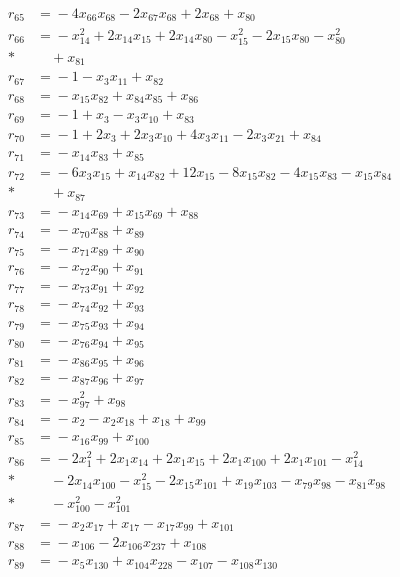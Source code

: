 \documentclass[11pt]{article}
\theoremstyle{remark}\newtheorem{remark}[theorem]{Remark}
\begin{document}
\begin{align*}
r_{65}&={}-4x_{66}x_{68}-2x_{67}x_{68}+2x_{68}+x_{80}\\[2pt]
r_{66}&={}-x_{14}^{2}+2x_{14}x_{15}+2x_{14}x_{80}-x_{15}^{2}-2x_{15}x_{80}-x_{80}^{2}\\*
&\quad{}+x_{81}\\[2pt]
r_{67}&={}-1-x_{3}x_{11}+x_{82}\\[2pt]
r_{68}&={}-x_{15}x_{82}+x_{84}x_{85}+x_{86}\\[2pt]
r_{69}&={}-1+x_{3}-x_{3}x_{10}+x_{83}\\[2pt]
r_{70}&={}-1+2x_{3}+2x_{3}x_{10}+4x_{3}x_{11}-2x_{3}x_{21}+x_{84}\\[2pt]
r_{71}&={}-x_{14}x_{83}+x_{85}\\[2pt]
r_{72}&={}-6x_{3}x_{15}+x_{14}x_{82}+12x_{15}-8x_{15}x_{82}-4x_{15}x_{83}-x_{15}x_{84}\\*
&\quad{}+x_{87}\\[2pt]
r_{73}&={}-x_{14}x_{69}+x_{15}x_{69}+x_{88}\\[2pt]
r_{74}&={}-x_{70}x_{88}+x_{89}\\[2pt]
r_{75}&={}-x_{71}x_{89}+x_{90}\\[2pt]
r_{76}&={}-x_{72}x_{90}+x_{91}\\[2pt]
r_{77}&={}-x_{73}x_{91}+x_{92}\\[2pt]
r_{78}&={}-x_{74}x_{92}+x_{93}\\[2pt]
r_{79}&={}-x_{75}x_{93}+x_{94}\\[2pt]
r_{80}&={}-x_{76}x_{94}+x_{95}\\[2pt]
r_{81}&={}-x_{86}x_{95}+x_{96}\\[2pt]
r_{82}&={}-x_{87}x_{96}+x_{97}\\[2pt]
r_{83}&={}-x_{97}^{2}+x_{98}\\[2pt]
r_{84}&={}-x_{2}-x_{2}x_{18}+x_{18}+x_{99}\\[2pt]
r_{85}&={}-x_{16}x_{99}+x_{100}\\[2pt]
r_{86}&={}-2x_{1}^{2}+2x_{1}x_{14}+2x_{1}x_{15}+2x_{1}x_{100}+2x_{1}x_{101}-x_{14}^{2}\\*
&\quad{}-2x_{14}x_{100}-x_{15}^{2}-2x_{15}x_{101}+x_{19}x_{103}-x_{79}x_{98}-x_{81}x_{98}\\*
&\quad{}-x_{100}^{2}-x_{101}^{2}\\[2pt]
r_{87}&={}-x_{2}x_{17}+x_{17}-x_{17}x_{99}+x_{101}\\[2pt]
r_{88}&={}-x_{106}-2x_{106}x_{237}+x_{108}\\[2pt]
r_{89}&={}-x_{5}x_{130}+x_{104}x_{228}-x_{107}-x_{108}x_{130}\\[2pt]

\end{align*}
\end{document}
